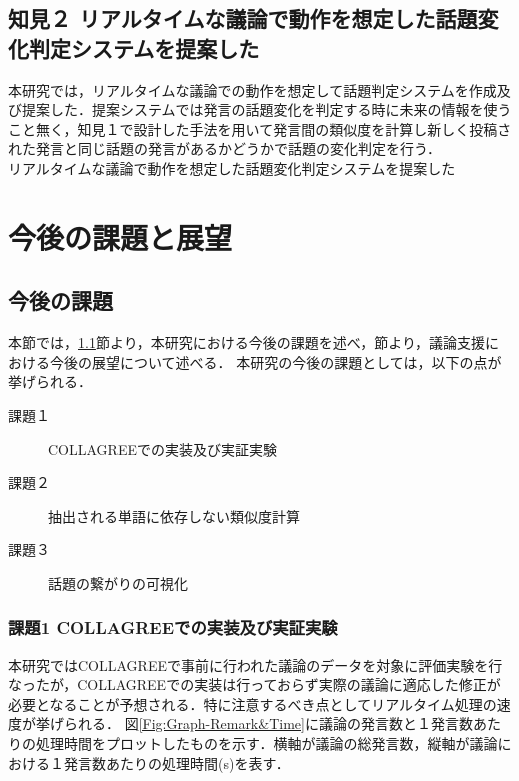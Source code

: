 \subsection*{知見２ リアルタイムな議論で動作を想定した話題変化判定システムを提案した}
本研究では，リアルタイムな議論での動作を想定して話題判定システムを作成及び提案した．提案システムでは発言の話題変化を判定する時に未来の情報を使うこと無く，知見１で設計した手法を用いて発言間の類似度を計算し新しく投稿された発言と同じ話題の発言があるかどうかで話題の変化判定を行う．\\
リアルタイムな議論で動作を想定した話題変化判定システムを提案した

\section{今後の課題と展望}
\label{con:task_and_future}
\subsection{今後の課題}
\label{con:task}
本節では，\ref{con:task}節より，本研究における今後の課題を述べ，節より，議論支援における今後の展望について述べる．
本研究の今後の課題としては，以下の点が挙げられる．
\begin{description}
  \item[課題１] COLLAGREEでの実装及び実証実験
  \item[課題２] 抽出される単語に依存しない類似度計算
  \item[課題３] 話題の繋がりの可視化
\end{description}
\subsubsection*{課題1 COLLAGREEでの実装及び実証実験}
本研究ではCOLLAGREEで事前に行われた議論のデータを対象に評価実験を行なったが，COLLAGREEでの実装は行っておらず実際の議論に適応した修正が必要となることが予想される．特に注意するべき点としてリアルタイム処理の速度が挙げられる．
図\ref{Fig:Graph-Remark&Time}に議論の発言数と１発言数あたりの処理時間をプロットしたものを示す．横軸が議論の総発言数，縦軸が議論における１発言数あたりの処理時間(s)を表す．

